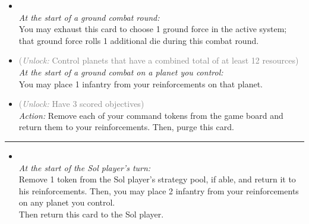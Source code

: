 \begin{multicols}{2}

\begin{itemize}
\item {}\\
\emph{At the start of a ground combat round:}\\
You may exhaust this card to choose 1 ground force in the active system; that ground force rolls 1 additional die during this combat round.
\item {} \textcolor{gray}{(\emph{Unlock:} Control planets that have a combined total of at least 12 resources)}\\
\emph{At the start of a ground combat on a planet you control:}\\
You may place 1 infantry from your reinforcements on that planet.
\item {} \textcolor{gray}{(\emph{Unlock:} Have 3 scored objectives)}\\
\emph{Action:} Remove each of your command tokens from the game board and return them to your reinforcements. Then, purge this card.
\end{itemize}

\vspace{-10pt}\rule{\hsize}{0.4pt}\vspace{5pt}


\begin{itemize}
\item {}\\
\emph{At the start of the Sol player's turn:}\\
Remove 1 token from the Sol player's strategy pool, if able, and return it to his reinforcements. Then, you may place 2 infantry from your reinforcements on any planet you control.\\
Then return this card to the Sol player.
\end{itemize}

\end{multicols}



